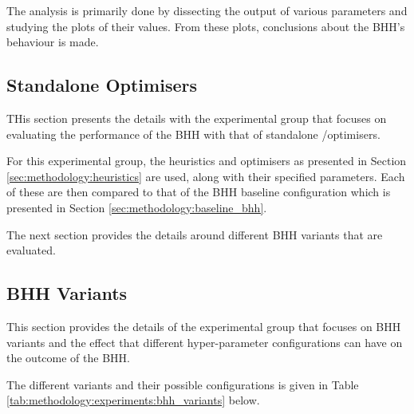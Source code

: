 The analysis is primarily done by dissecting the output of various parameters and studying the plots of their values. From these plots, conclusions about the \ac{BHH}'s behaviour is made.

\subsection{Standalone Optimisers}
\label{sec:methodology:experiments:standalone_optimisers}

THis section presents the details with the experimental group that focuses on evaluating the performance of the \ac{BHH} with that of standalone /optimisers.

For this experimental group, the heuristics and optimisers as presented in Section \ref{sec:methodology:heuristics} are used, along with their specified parameters. Each of these are then compared to that of the \ac{BHH} baseline configuration which is presented in Section \ref{sec:methodology:baseline_bhh}.

The next section provides the details around different \ac{BHH} variants that are evaluated.

\subsection{BHH Variants}
\label{sec:methodology:experiments:bhh_variants}

This section provides the details of the experimental group that focuses on \ac{BHH} variants and the effect that different hyper-parameter configurations can have on the outcome of the \ac{BHH}.

The different variants and their possible configurations is given in Table \ref{tab:methodology:experiments:bhh_variants} below.

\begin{table}[htbp]
    \centering
    \caption{BHH variants and their configuration}
    \label{tab:methodology:experiments:bhh_variants}%
    \par\bigskip
\end{table}%

